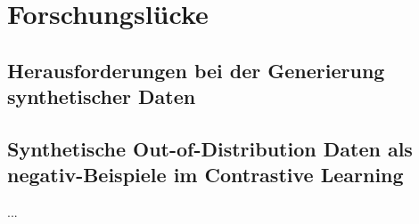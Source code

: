 

\section{Forschungslücke} \label{sec-research-gap}



\subsection{Herausforderungen bei der Generierung synthetischer Daten} \label{subsec-challenges-synt-data}



\subsection{Synthetische Out-of-Distribution Daten als negativ-Beispiele im Contrastive Learning} \label{subsec-synt-ood-contrastive}

...

